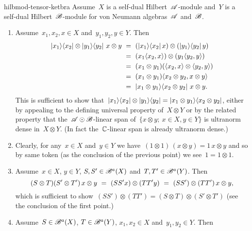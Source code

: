 \begin{solution}{hilbmod-tensor-ketbra}%
Assume~$X$ is a self-dual Hilbert~$\mathscr{A}$-module
    and~$Y$ is a self-dual Hilbert~$\mathscr{B}$-module
        for von Neumann algebras~$\mathscr{A}$ and~$\mathscr{B}$.
\begin{enumerate}
\item
    Assume~$x_1,x_2,x \in X$ and~$y_1,y_2,y \in Y$.
        Then
    \begin{align*}
        \left|x_1\right>\!\left<x_2\right| \otimes \left|y_1\right>\!\left<y_2\right| 
            \, x \otimes y 
        &\ =\  (\left|x_1\right>\!\left<x_2\right| x) \otimes (\left|y_1\right>\!\left<y_2\right| y) \\
        &\ =\ (x_1 \langle x_2, x\rangle) \otimes (y_1 \langle y_2, y\rangle) \\
        &\ =\ (x_1 \otimes y_1)  (\langle x_2, x\rangle \otimes \langle y_2, y\rangle) \\
        &\ =\ (x_1 \otimes y_1)  \langle x_2 \otimes y_2, x \otimes y\rangle \\
        &\ =\ \left|x_1 \otimes y_1\right>\!\left<x_2 \otimes y_2\right| \, x\otimes y.
    \end{align*}
This is sufficient to show
    that~$\left|x_1\right>\!\left<x_2\right| \otimes \left|y_1\right>\!\left<y_2\right| 
        = \left|x_1 \otimes y_1\right>\!\left<x_2 \otimes y_2\right|$,
    either by appealing to the defining universal property of~$X \otimes Y$
    or by the related property
    that the~$\mathscr{A} \odot \mathscr{B}$-linear
    span of~$\{x \otimes y; \ x \in X, y\in Y\}$
    is ultranorm dense in~$X \otimes Y$.
        (In fact the~$\mathbb{C}$-linear span is already ultranorm dense.)
\item
    Clearly, for any~$x \in X$ and~$y \in Y$
            we have~$(1 \otimes 1) \, (x \otimes y)
                    = 1 \, x \otimes y$
        and so by same token (as the conclusion of the previous point)
        we see~$1 = 1\otimes 1$.
\item
    Assume~$x \in X$, $y \in Y$, $S,S' \in \mathscr{B}^a(X)$ and~$T,T' \in \mathscr{B}^a(Y)$.
        Then
\begin{equation*}
    (S \otimes T) (S' \otimes T') \, x \otimes y
         \ = \ (SS' x) \otimes (TT' y) \\
         \ = \ (SS')  \otimes (TT') \, x \otimes y,
\end{equation*}
        which is sufficient to show~$(SS') \otimes (TT') = (S\otimes T) \otimes (S' \otimes T')$ (see the conclusion of the first point.)
\item
    Assume~$S \in \mathscr{B}^a(X)$, $T \in \mathscr{B}^a(Y)$, $x_1,x_2\in X$
        and~$y_1,y_2\in Y$.
    Then

\end{enumerate}
\end{solution}
